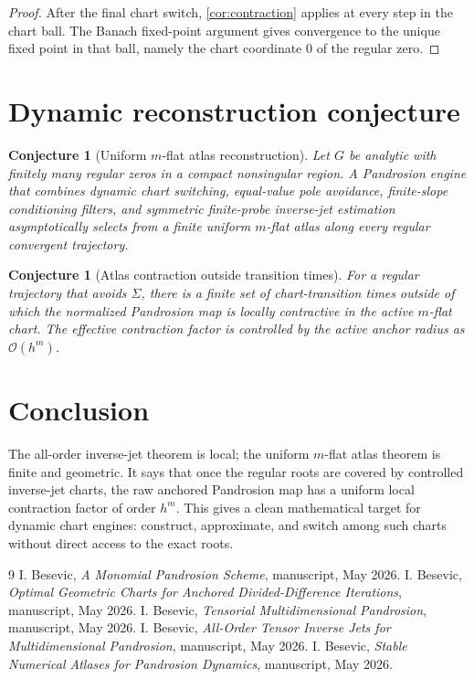 \documentclass[11pt]{article}
\newtheorem{conjecture}[definition]{Conjecture}
\newcommand{\Oterm}{\mathcal O}
\begin{document}
\begin{proof}
After the final chart switch, \cref{cor:contraction} applies at every step in the chart ball. The Banach fixed-point argument gives convergence to the unique fixed point in that ball, namely the chart coordinate \(0\) of the regular zero.
\end{proof}

\section{Dynamic reconstruction conjecture}

\begin{conjecture}[Uniform \(m\)-flat atlas reconstruction]
Let \(G\) be analytic with finitely many regular zeros in a compact nonsingular region. A Pandrosion engine that combines dynamic chart switching, equal-value pole avoidance, finite-slope conditioning filters, and symmetric finite-probe inverse-jet estimation asymptotically selects from a finite uniform \(m\)-flat atlas along every regular convergent trajectory.
\end{conjecture}

\begin{conjecture}[Atlas contraction outside transition times]
For a regular trajectory that avoids \(\Sigma\), there is a finite set of chart-transition times outside of which the normalized Pandrosion map is locally contractive in the active \(m\)-flat chart. The effective contraction factor is controlled by the active anchor radius as \(\Oterm(h^m)\).
\end{conjecture}

\section{Conclusion}

The all-order inverse-jet theorem is local; the uniform \(m\)-flat atlas theorem is finite and geometric. It says that once the regular roots are covered by controlled inverse-jet charts, the raw anchored Pandrosion map has a uniform local contraction factor of order \(h^m\). This gives a clean mathematical target for dynamic chart engines: construct, approximate, and switch among such charts without direct access to the exact roots.

\begin{thebibliography}{9}
I. Besevic, \emph{A Monomial Pandrosion Scheme}, manuscript, May 2026.
I. Besevic, \emph{Optimal Geometric Charts for Anchored Divided-Difference Iterations}, manuscript, May 2026.
I. Besevic, \emph{Tensorial Multidimensional Pandrosion}, manuscript, May 2026.
I. Besevic, \emph{All-Order Tensor Inverse Jets for Multidimensional Pandrosion}, manuscript, May 2026.
I. Besevic, \emph{Stable Numerical Atlases for Pandrosion Dynamics}, manuscript, May 2026.
\end{thebibliography}
\end{document}
